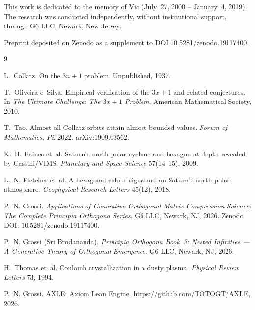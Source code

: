 \documentclass[11pt]{article}
\begin{document}
This work is dedicated to the memory of Vic (July~27, 2000 -- January~4, 2019). The research was
conducted independently, without institutional support, through G6 LLC, Newark, New Jersey.

Preprint deposited on Zenodo as a supplement to DOI 10.5281/zenodo.19117400.

\begin{thebibliography}{9}

L.~Collatz. On the $3n + 1$ problem. Unpublished, 1937.

T.~Oliveira e~Silva. Empirical verification of the $3x + 1$ and related conjectures.
In \textit{The Ultimate Challenge: The $3x + 1$ Problem}, American Mathematical Society, 2010.

T.~Tao. Almost all Collatz orbits attain almost bounded values.
\textit{Forum of Mathematics, Pi}, 2022. arXiv:1909.03562.

K.~H. Baines et~al. Saturn's north polar cyclone and hexagon at depth revealed by Cassini/VIMS.
\textit{Planetary and Space Science} 57(14--15), 2009.

L.~N. Fletcher et~al. A hexagonal colour signature on Saturn's north polar atmosphere.
\textit{Geophysical Research Letters} 45(12), 2018.

P.~N. Grossi. \textit{Applications of Generative Orthogonal Matrix Compression Science:
The Complete Principia Orthogona Series}. G6 LLC, Newark, NJ, 2026.
Zenodo DOI: 10.5281/zenodo.19117400.

P.~N. Grossi (Sri Brodananda). \textit{Principia Orthogona Book~3: Nested Infinities ---
A Generative Theory of Orthogonal Emergence}. G6 LLC, Newark, NJ, 2026.

H.~Thomas et~al. Coulomb crystallization in a dusty plasma.
\textit{Physical Review Letters} 73, 1994.

P.~N. Grossi. AXLE: Axiom Lean Engine. \url{https://github.com/TOTOGT/AXLE}, 2026.

\end{thebibliography}
\end{document}
